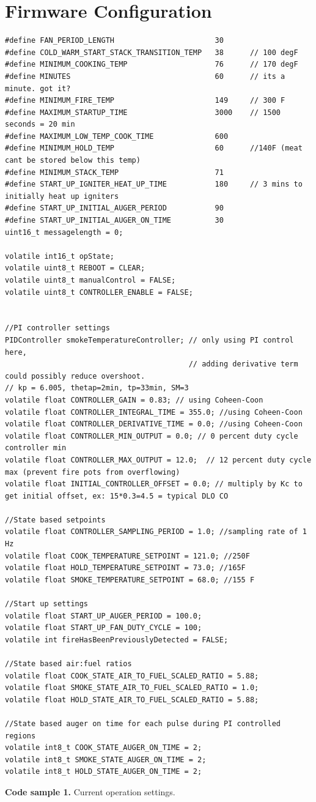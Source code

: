 \documentclass{article}
\begin{document}
\section{Firmware Configuration}
\begin{lstlisting}
#define FAN_PERIOD_LENGTH                       30
#define COLD_WARM_START_STACK_TRANSITION_TEMP   38      // 100 degF
#define MINIMUM_COOKING_TEMP                    76      // 170 degF
#define MINUTES                                 60      // its a minute. got it?
#define MINIMUM_FIRE_TEMP                       149     // 300 F
#define MAXIMUM_STARTUP_TIME                    3000    // 1500 seconds = 20 min
#define MAXIMUM_LOW_TEMP_COOK_TIME              600
#define MINIMUM_HOLD_TEMP                       60      //140F (meat cant be stored below this temp)
#define MINIMUM_STACK_TEMP                      71
#define START_UP_IGNITER_HEAT_UP_TIME           180     // 3 mins to initially heat up igniters
#define START_UP_INITIAL_AUGER_PERIOD           90
#define START_UP_INITIAL_AUGER_ON_TIME          30
uint16_t messagelength = 0;

volatile int16_t opState;
volatile uint8_t REBOOT = CLEAR;
volatile uint8_t manualControl = FALSE;
volatile uint8_t CONTROLLER_ENABLE = FALSE;


//PI controller settings
PIDController smokeTemperatureController; // only using PI control here,
                                          // adding derivative term could possibly reduce overshoot.
// kp = 6.005, thetap=2min, tp=33min, SM=3
volatile float CONTROLLER_GAIN = 0.83; // using Coheen-Coon 
volatile float CONTROLLER_INTEGRAL_TIME = 355.0; //using Coheen-Coon
volatile float CONTROLLER_DERIVATIVE_TIME = 0.0; //using Coheen-Coon
volatile float CONTROLLER_MIN_OUTPUT = 0.0; // 0 percent duty cycle controller min
volatile float CONTROLLER_MAX_OUTPUT = 12.0;  // 12 percent duty cycle max (prevent fire pots from overflowing)
volatile float INITIAL_CONTROLLER_OFFSET = 0.0; // multiply by Kc to get initial offset, ex: 15*0.3=4.5 = typical DLO CO

//State based setpoints
volatile float CONTROLLER_SAMPLING_PERIOD = 1.0; //sampling rate of 1 Hz
volatile float COOK_TEMPERATURE_SETPOINT = 121.0; //250F
volatile float HOLD_TEMPERATURE_SETPOINT = 73.0; //165F
volatile float SMOKE_TEMPERATURE_SETPOINT = 68.0; //155 F

//Start up settings
volatile float START_UP_AUGER_PERIOD = 100.0;
volatile float START_UP_FAN_DUTY_CYCLE = 100;
volatile int fireHasBeenPreviouslyDetected = FALSE;

//State based air:fuel ratios
volatile float COOK_STATE_AIR_TO_FUEL_SCALED_RATIO = 5.88;
volatile float SMOKE_STATE_AIR_TO_FUEL_SCALED_RATIO = 1.0;
volatile float HOLD_STATE_AIR_TO_FUEL_SCALED_RATIO = 5.88;

//State based auger on time for each pulse during PI controlled regions
volatile int8_t COOK_STATE_AUGER_ON_TIME = 2;
volatile int8_t SMOKE_STATE_AUGER_ON_TIME = 2;
volatile int8_t HOLD_STATE_AUGER_ON_TIME = 2;
\end{lstlisting}
\textbf{Code sample 1.} Current operation settings.
\end{document}
